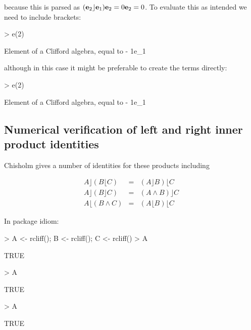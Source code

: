 \documentclass{article}
\begin{document}
because this is parsed as $({\bf e}_{2}\rfloor{\bf e}_{1}){\bf e}_{2}=0{\bf e}_{2}=0$.  To
evaluate this as intended we need to include brackets:

\begin{Schunk}
\begin{Sinput}
> e(2) %
\end{Sinput}
\begin{Soutput}
Element of a Clifford algebra, equal to
- 1e_1
\end{Soutput}
\end{Schunk}

although in this case it might be preferable to create the terms directly:

\begin{Schunk}
\begin{Sinput}
> e(2) %
\end{Sinput}
\begin{Soutput}
Element of a Clifford algebra, equal to
- 1e_1
\end{Soutput}
\end{Schunk}


\subsection{Numerical verification of left and right inner product identities}

Chisholm gives a number of identities for these products including

\begin{eqnarray}
  A\rfloor(B\lfloor C) &=& (A\rfloor B)\lfloor C\\
  A\rfloor(B\rfloor C) &=& (A\wedge B)\rfloor C\\
  A\lfloor(B\wedge  C) &=& (A\lfloor B)\lfloor C
\end{eqnarray}

In package idiom:

\begin{Schunk}
\begin{Sinput}
> A <- rcliff();  B <- rcliff();  C <- rcliff()
> A %
\end{Sinput}
\begin{Soutput}
[1] TRUE
\end{Soutput}
\begin{Sinput}
> A %
\end{Sinput}
\begin{Soutput}
[1] TRUE
\end{Soutput}
\begin{Sinput}
> A %
\end{Sinput}
\begin{Soutput}
[1] TRUE
\end{Soutput}
\end{Schunk}
\end{document}

